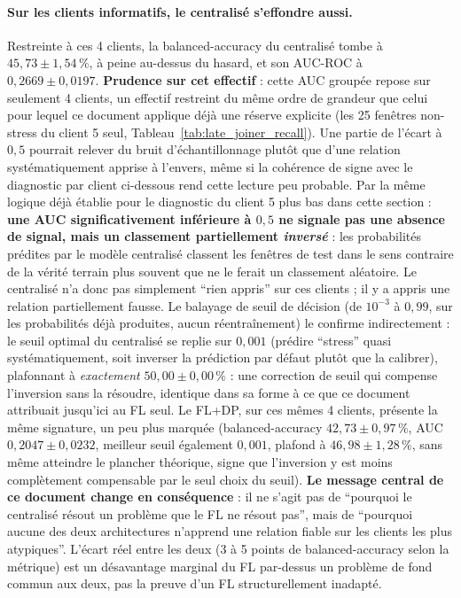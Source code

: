 \documentclass{article}
\begin{document}
\paragraph{Sur les clients informatifs, le centralisé s'effondre aussi.} Restreinte à
ces 4 clients, la balanced-accuracy du centralisé tombe à $45{,}73 \pm 1{,}54\,\%$,
à peine au-dessus du hasard, et son AUC-ROC à $0{,}2669 \pm 0{,}0197$. \textbf{Prudence
sur cet effectif} : cette AUC groupée repose sur seulement 4 clients, un effectif
restreint du même ordre de grandeur que celui pour lequel ce document applique déjà une
réserve explicite (les 25 fenêtres non-stress du client 5 seul,
Tableau~\ref{tab:late_joiner_recall}). Une partie de l'écart à $0{,}5$ pourrait relever
du bruit d'échantillonnage plutôt que d'une relation systématiquement apprise à l'envers,
même si la cohérence de signe avec le diagnostic par client ci-dessous rend cette lecture
peu probable. Par la même logique déjà établie pour le diagnostic du client 5 plus bas
dans cette section :
\textbf{une AUC significativement inférieure à $0{,}5$ ne signale pas une absence de
signal, mais un classement partiellement \emph{inversé}} : les probabilités prédites
par le modèle centralisé classent les fenêtres de test dans le sens contraire de la
vérité terrain plus souvent que ne le ferait un classement aléatoire. Le centralisé n'a
donc pas simplement ``rien appris'' sur ces clients ; il y a appris une relation
partiellement fausse. Le balayage de seuil de décision (de $10^{-3}$ à $0{,}99$, sur les
probabilités déjà produites, aucun réentraînement) le confirme indirectement : le seuil
optimal du centralisé se replie sur $0{,}001$ (prédire ``stress'' quasi systématiquement,
soit inverser la prédiction par défaut plutôt que la calibrer), plafonnant à
\emph{exactement} $50{,}00 \pm 0{,}00\,\%$ : une correction de seuil qui compense
l'inversion sans la résoudre, identique dans sa forme à ce que ce document attribuait
jusqu'ici au FL seul. Le FL+DP, sur ces mêmes 4 clients, présente la même signature,
un peu plus marquée (balanced-accuracy $42{,}73 \pm 0{,}97\,\%$, AUC
$0{,}2047 \pm 0{,}0232$, meilleur seuil également $0{,}001$, plafond à
$46{,}98 \pm 1{,}28\,\%$, sans même atteindre le plancher théorique, signe que
l'inversion y est moins complètement compensable par le seul choix du seuil).
\textbf{Le message central de ce document change en conséquence} : il ne
s'agit pas de ``pourquoi le centralisé résout un problème que le FL ne résout pas'',
mais de ``pourquoi aucune des deux architectures n'apprend une relation fiable sur les
clients les plus atypiques''. L'écart réel entre les deux (3 à 5 points de
balanced-accuracy selon la métrique) est un désavantage marginal du FL par-dessus un
problème de fond commun aux
deux, pas la preuve d'un FL structurellement inadapté.
\end{document}
